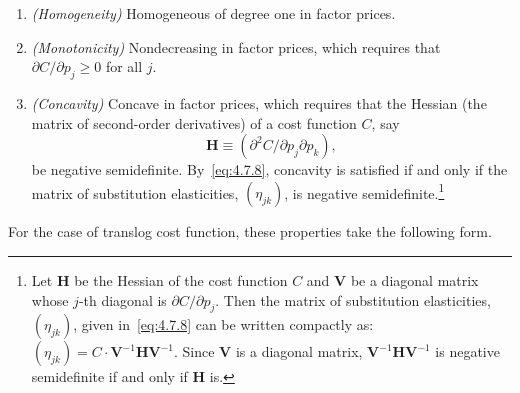 \begin{enumerate}
\item \textit{(Homogeneity)}\quad
Homogeneous of degree one in factor prices.

\item \textit{(Monotonicity)}\quad
Nondecreasing in factor prices, which requires that
$\partial C / \partial p_j \geq 0$ for all $j$.

\item \textit{(Concavity)}\quad
Concave in factor prices, which requires that the Hessian (the
matrix of second-order derivatives) of a cost function $C$, say
\[
\mathbf{H} \equiv (\partial^2 C / \partial p_j \partial p_k),
\]
be negative semidefinite. By~\eqref{eq:4.7.8}, concavity is satisfied if and only if
the matrix of substitution elasticities, $(\eta_{jk})$, is negative
semidefinite.\footnote{Let $\mathbf{H}$ be the Hessian of the cost function $C$
and $\mathbf{V}$ be a diagonal matrix whose $j$-th diagonal is $\partial C / \partial p_j$.
Then the matrix of substitution elasticities, $(\eta_{jk})$, given in~\eqref{eq:4.7.8}
can be written compactly as: $(\eta_{jk}) = C \cdot \mathbf{V}^{-1} \mathbf{H}
\mathbf{V}^{-1}$. Since $\mathbf{V}$ is a diagonal matrix,
$\mathbf{V}^{-1} \mathbf{H} \mathbf{V}^{-1}$ is negative semidefinite if and only
if $\mathbf{H}$ is.}
\end{enumerate}

For the case of translog cost function, these properties take the following form.

